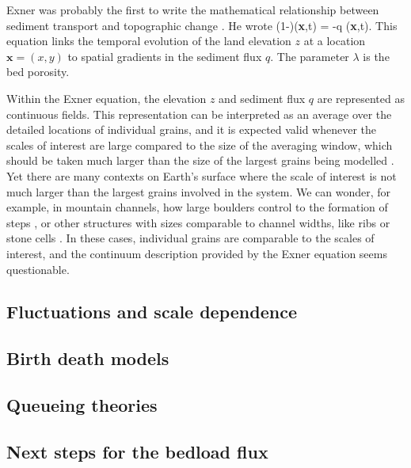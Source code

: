 Exner was probably the first to write the mathematical relationship between sediment transport and topographic change \citep{Exner1925}. He wrote
\be (1-\lambda)(\textbf{x},t) = -\nabla q (\textbf{x},t). \ee
This equation links the temporal evolution of the land elevation $z$ at a location $\textbf{x}=(x,y)$ to spatial gradients in the sediment flux $q$. The parameter $\lambda$ is the bed porosity.

Within the Exner equation, the elevation $z$ and sediment flux $q$ are represented as continuous fields. This representation can be interpreted as an average over the detailed locations of individual grains, and it is expected valid whenever the scales of interest are large compared to the size of the averaging window, which should be taken much larger than the size of the largest grains being modelled \citep{Coleman2009}. 
Yet there are many contexts on Earth's surface where the scale of interest is not much larger than the largest grains involved in the system. We can wonder, for example, in mountain channels, how large boulders control to the formation of steps \citep{Church2007,Zimmerman2008,Saletti2020}, or other structures with sizes comparable to channel widths, like ribs or stone cells \citep{Hassan2008,Venditti2017}. In these cases, individual grains are comparable to the scales of interest, and the continuum description provided by the Exner equation seems questionable.



\subsection{Fluctuations and scale dependence}

\subsection{Birth death models}

\subsection{Queueing theories}

\subsection{Next steps for the bedload flux}


\endinput



